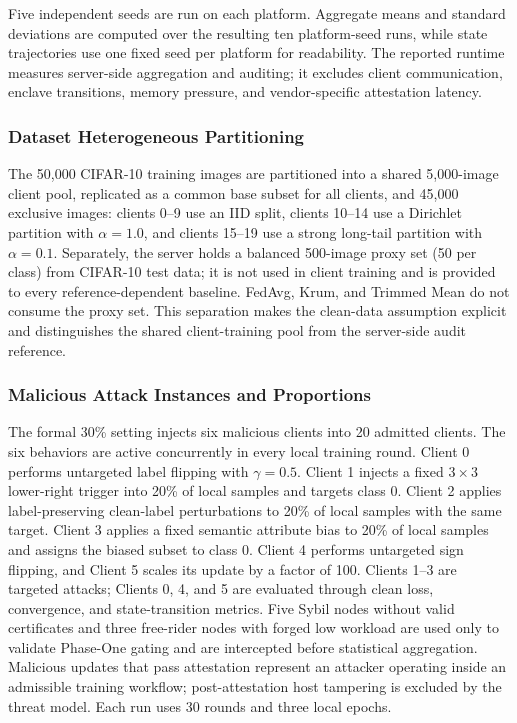 \documentclass[final,5p,times,twocolumn]{elsarticle/elsarticle}
\begin{document}
Five independent seeds are run on each platform. Aggregate means and standard
deviations are computed over the resulting ten platform-seed runs, while
state trajectories use one fixed seed per platform for readability. The
reported runtime measures server-side aggregation and auditing; it excludes
client communication, enclave transitions, memory pressure, and
vendor-specific attestation latency.

\subsubsection{Dataset Heterogeneous Partitioning}
The 50,000 CIFAR-10 training images are partitioned into a shared 5,000-image
client pool, replicated as a common base subset for all clients, and 45,000
exclusive images: clients 0--9 use an IID split, clients 10--14 use a Dirichlet
partition with $\alpha=1.0$, and clients 15--19 use a strong long-tail partition
with $\alpha=0.1$. Separately, the server holds a balanced 500-image proxy
set (50 per class) from CIFAR-10 test data; it is not used in client training and
is provided to every reference-dependent baseline. FedAvg, Krum, and Trimmed
Mean do not consume the proxy set. This separation makes the clean-data
assumption explicit and distinguishes the shared client-training pool from the
server-side audit reference.

\subsubsection{Malicious Attack Instances and Proportions}
The formal 30\% setting injects six malicious clients into 20 admitted clients.
The six behaviors are active concurrently in every local training round. Client
0 performs untargeted label flipping with $\gamma=0.5$. Client 1 injects a
fixed $3\times3$ lower-right trigger into 20\% of local samples and targets
class 0. Client 2 applies label-preserving clean-label perturbations to 20\% of
local samples with the same target. Client 3 applies a fixed semantic attribute
bias to 20\% of local samples and assigns the biased subset to class 0. Client
4 performs untargeted sign flipping, and Client 5 scales its update by a factor
of 100. Clients 1--3 are targeted attacks; Clients 0, 4, and 5 are evaluated
through clean loss, convergence, and state-transition metrics. Five Sybil nodes
without valid certificates and three free-rider nodes with forged low workload
are used only to validate Phase-One gating and are intercepted before
statistical aggregation. Malicious updates that pass attestation represent an
attacker operating inside an admissible training workflow; post-attestation
host tampering is excluded by the threat model. Each run uses 30 rounds and
three local epochs.
\end{document}
